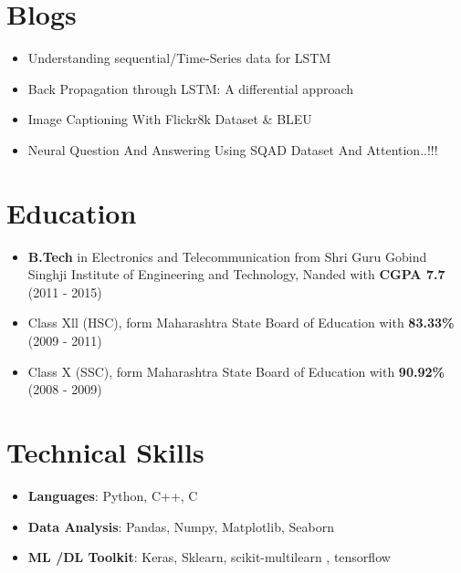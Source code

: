 \documentclass[letterpaper,11pt]{article}
\newcommand{\resumeItem}[2]{
  \item\small{
    \textbf{#1}{: #2 \vspace{-2pt}}
  }
}
\newcommand{\resumeSubItem}[2]{\resumeItem{#1}{#2}\vspace{-4pt}}
\newcommand{\resumePoint}[1]{\item\small{{#1}\vspace{-4pt}}}
\newcommand{\resumeSubHeadingListStart}{\begin{itemize}[leftmargin=*]}
\newcommand{\resumeSubHeadingListEnd}{\end{itemize}}
\begin{document}
\section{Blogs}
	\resumeSubHeadingListStart
 	\resumePoint{Understanding sequential/Time-Series data for LSTM}
 	\resumePoint{Back Propagation through LSTM: A differential approach}
 	\resumePoint{Image Captioning With Flickr8k Dataset \& BLEU}
 	\resumePoint{Neural Question And Answering Using SQAD Dataset And Attention..!!!}
 	\resumeSubHeadingListEnd
   

\section{Education}
  \resumeSubHeadingListStart
    \resumePoint{\textbf{B.Tech} in Electronics and Telecommunication from Shri Guru Gobind Singhji Institute of Engineering and Technology, Nanded with \textbf{CGPA 7.7} (2011 - 2015)}
    \resumePoint{Class Xll (HSC), form Maharashtra State Board of Education with \textbf{83.33\%} (2009 - 2011)}
     \resumePoint{Class X (SSC), form Maharashtra State Board of Education with \textbf{90.92\%}  (2008 - 2009)}
  \resumeSubHeadingListEnd  

\section{Technical Skills}
  \resumeSubHeadingListStart
    \resumeSubItem{Languages}{Python, C++, C}
    \resumeSubItem{Data Analysis}{Pandas, Numpy, Matplotlib, Seaborn}
    \resumeSubItem{ML /DL Toolkit}{Keras, Sklearn, scikit-multilearn , tensorflow}
  \resumeSubHeadingListEnd

\end{document}
